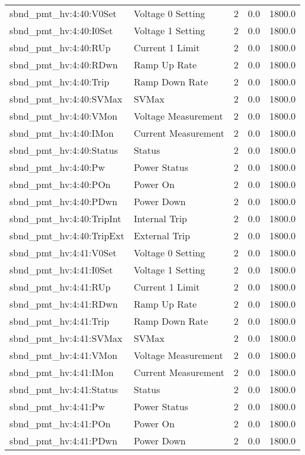 \begin{center}
\begin{longtable}{l | l l l l }
sbnd\_pmt\_hv:4:40:V0Set & Voltage 0 Setting & 2 & 0.0 & 1800.0\\ 
sbnd\_pmt\_hv:4:40:I0Set & Voltage 1 Setting & 2 & 0.0 & 1800.0\\ 
sbnd\_pmt\_hv:4:40:RUp & Current 1 Limit & 2 & 0.0 & 1800.0\\ 
sbnd\_pmt\_hv:4:40:RDwn & Ramp Up Rate & 2 & 0.0 & 1800.0\\ 
sbnd\_pmt\_hv:4:40:Trip & Ramp Down Rate & 2 & 0.0 & 1800.0\\ 
sbnd\_pmt\_hv:4:40:SVMax & SVMax & 2 & 0.0 & 1800.0\\ 
sbnd\_pmt\_hv:4:40:VMon & Voltage Measurement & 2 & 0.0 & 1800.0\\ 
sbnd\_pmt\_hv:4:40:IMon & Current Measurement & 2 & 0.0 & 1800.0\\ 
sbnd\_pmt\_hv:4:40:Status & Status & 2 & 0.0 & 1800.0\\ 
sbnd\_pmt\_hv:4:40:Pw & Power Status & 2 & 0.0 & 1800.0\\ 
sbnd\_pmt\_hv:4:40:POn & Power On & 2 & 0.0 & 1800.0\\ 
sbnd\_pmt\_hv:4:40:PDwn & Power Down & 2 & 0.0 & 1800.0\\ 
sbnd\_pmt\_hv:4:40:TripInt & Internal Trip & 2 & 0.0 & 1800.0\\ 
sbnd\_pmt\_hv:4:40:TripExt & External Trip & 2 & 0.0 & 1800.0\\ 
sbnd\_pmt\_hv:4:41:V0Set & Voltage 0 Setting & 2 & 0.0 & 1800.0\\ 
sbnd\_pmt\_hv:4:41:I0Set & Voltage 1 Setting & 2 & 0.0 & 1800.0\\ 
sbnd\_pmt\_hv:4:41:RUp & Current 1 Limit & 2 & 0.0 & 1800.0\\ 
sbnd\_pmt\_hv:4:41:RDwn & Ramp Up Rate & 2 & 0.0 & 1800.0\\ 
sbnd\_pmt\_hv:4:41:Trip & Ramp Down Rate & 2 & 0.0 & 1800.0\\ 
sbnd\_pmt\_hv:4:41:SVMax & SVMax & 2 & 0.0 & 1800.0\\ 
sbnd\_pmt\_hv:4:41:VMon & Voltage Measurement & 2 & 0.0 & 1800.0\\ 
sbnd\_pmt\_hv:4:41:IMon & Current Measurement & 2 & 0.0 & 1800.0\\ 
sbnd\_pmt\_hv:4:41:Status & Status & 2 & 0.0 & 1800.0\\ 
sbnd\_pmt\_hv:4:41:Pw & Power Status & 2 & 0.0 & 1800.0\\ 
sbnd\_pmt\_hv:4:41:POn & Power On & 2 & 0.0 & 1800.0\\ 
sbnd\_pmt\_hv:4:41:PDwn & Power Down & 2 & 0.0 & 1800.0\\ 

\end{longtable}
\end{center}
